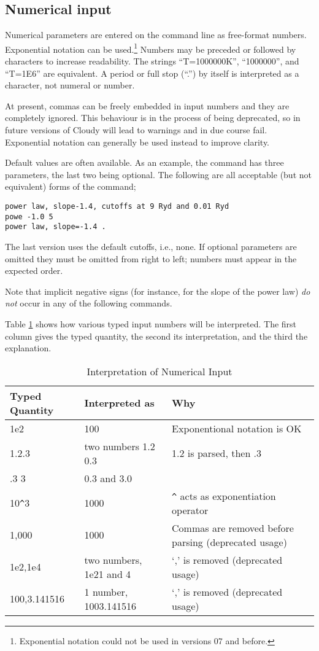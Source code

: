 \subsection{Numerical input}

Numerical parameters are entered on the command line as free-format
numbers.
Exponential notation can be used.\footnote{Exponential notation could not be used in versions 07 and before.}
Numbers may be preceded
or followed by characters to increase readability.
The strings
``T=1000000K'', ``1000000'', and ``T=1E6'' are equivalent.
A period or full stop (``.'') by itself is interpreted as a character,
not numeral or number.

At present, commas can be freely embedded
in input numbers and they are completely ignored.  This behaviour is
in the process of being deprecated, so in future versions of Cloudy will
lead to warnings and in due course fail.  Exponential notation can
generally be used instead to improve clarity.

Default values are often available.
As an example, the  command
has three parameters, the last two being optional.  The following are all
acceptable (but not equivalent) forms of the command;
\begin{verbatim}
power law, slope-1.4, cutoffs at 9 Ryd and 0.01 Ryd
powe -1.0 5
power law, slope=-1.4 .
\end{verbatim}
The last version uses the default cutoffs, i.e., none.  If optional
parameters are omitted they must be omitted from right to left; numbers
must appear in the expected order.

Note that implicit negative signs (for instance, for the slope of the
power law) \emph{do not} occur in any of the following commands.

Table \ref{tab:FreeFormatNumbers} shows how various typed
input numbers will be interpreted.
The first column gives the typed quantity,
the second its interpretation, and the third the explanation.

\begin{table}
\centering
\caption{\label{tab:FreeFormatNumbers}
Interpretation of Numerical Input}
\begin{tabular}{llp{12pc}}
\hline
Typed Quantity& Interpreted as& Why\\
\hline
1e2& 100& Exponentional notation is OK\\
1.2.3& two numbers 1.2 0.3& 1.2 is parsed, then .3\\
.3 3& 0.3 and 3.0\\
10\verb|^|3 & 1000 & \verb|^| acts as exponentiation operator\\
1,000& 1000& Commas are removed before parsing (deprecated usage)\\
1e2,1e4& two numbers, 1e21 and 4& `,' is removed (deprecated usage)\\
100,3.141516& 1 number, 1003.141516& `,' is removed (deprecated usage)\\
\hline
\end{tabular}
\end{table}


